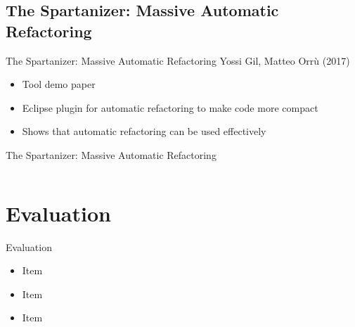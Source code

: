 \documentclass{beamer}
\begin{document}
\subsection{The Spartanizer: Massive Automatic Refactoring}

\begin{frame}{The Spartanizer: Massive Automatic Refactoring}
  {Yossi Gil, Matteo Orrù (2017)}
  
  \begin{itemize}
    \item Tool demo paper
    \item Eclipse plugin for automatic refactoring to make code more compact
    \pause
    \item Shows that automatic refactoring can be used effectively
  \end{itemize}
\end{frame}

\begin{frame}[fragile]{The Spartanizer: Massive Automatic Refactoring}
	\begin{columns}[T]
		\begin{column}{.49\textwidth}
			
		\end{column}
		\begin{column}{.5\textwidth}
			
		\end{column}
	\end{columns}
\end{frame}

\section{Evaluation}

\begin{frame}{Evaluation}	
	\begin{itemize}
		\item Item
		\item Item
		\pause
		\item Item
	\end{itemize}
\end{frame}
\end{document}
